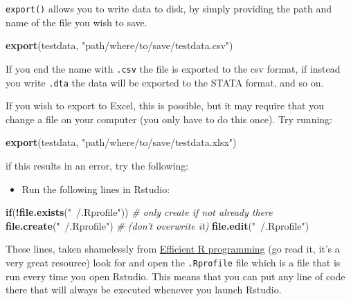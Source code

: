 \documentclass[]{gitbook}
\newenvironment{Shaded}{\begin{snugshade}}{\end{snugshade}}
\newcommand{\CommentTok}[1]{\textcolor[rgb]{0.56,0.35,0.01}{\textit{#1}}}
\newcommand{\ControlFlowTok}[1]{\textcolor[rgb]{0.13,0.29,0.53}{\textbf{#1}}}
\newcommand{\KeywordTok}[1]{\textcolor[rgb]{0.13,0.29,0.53}{\textbf{#1}}}
\newcommand{\NormalTok}[1]{#1}
\newcommand{\OperatorTok}[1]{\textcolor[rgb]{0.81,0.36,0.00}{\textbf{#1}}}
\newcommand{\StringTok}[1]{\textcolor[rgb]{0.31,0.60,0.02}{#1}}
\providecommand{\tightlist}{%
  \setlength{\itemsep}{0pt}\setlength{\parskip}{0pt}}
\theoremstyle{definition}
\theoremstyle{definition}
\theoremstyle{definition}
\theoremstyle{remark}
\begin{document}
\texttt{export()} allows you to write data to disk, by simply providing
the path and name of the file you wish to save.

\begin{Shaded}
\begin{Highlighting}[]
\KeywordTok{export}\NormalTok{(testdata, }\StringTok{"path/where/to/save/testdata.csv"}\NormalTok{)}
\end{Highlighting}
\end{Shaded}

If you end the name with \texttt{.csv} the file is exported to the csv
format, if instead you write \texttt{.dta} the data will be exported to
the STATA format, and so on.

If you wish to export to Excel, this is possible, but it may require
that you change a file on your computer (you only have to do this once).
Try running:

\begin{Shaded}
\begin{Highlighting}[]
\KeywordTok{export}\NormalTok{(testdata, }\StringTok{"path/where/to/save/testdata.xlsx"}\NormalTok{)}
\end{Highlighting}
\end{Shaded}

if this results in an error, try the following:

\begin{itemize}
\tightlist
\item
  Run the following lines in Rstudio:
\end{itemize}

\begin{Shaded}
\begin{Highlighting}[]
\ControlFlowTok{if}\NormalTok{(}\OperatorTok{!}\KeywordTok{file.exists}\NormalTok{(}\StringTok{"~/.Rprofile"}\NormalTok{)) }\CommentTok{# only create if not already there}
    \KeywordTok{file.create}\NormalTok{(}\StringTok{"~/.Rprofile"}\NormalTok{)    }\CommentTok{# (don't overwrite it)}
\KeywordTok{file.edit}\NormalTok{(}\StringTok{"~/.Rprofile"}\NormalTok{)}
\end{Highlighting}
\end{Shaded}

These lines, taken shamelessly from
\href{https://csgillespie.github.io/efficientR/3-3-r-startup.html\#rprofile}{Efficient
R programming} (go read it, it's a very great resource) look for and
open the \texttt{.Rprofile} file which is a file that is run every time
you open Rstudio. This means that you can put any line of code there
that will always be executed whenever you launch Rstudio.
\end{document}
